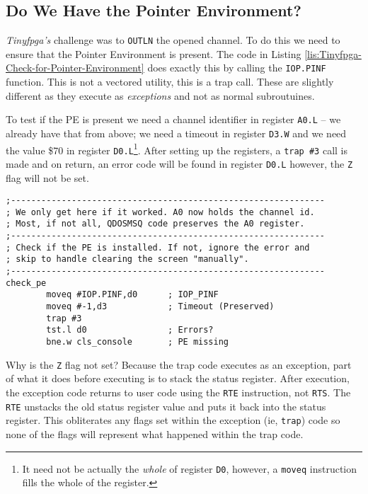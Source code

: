 \subsection{Do We Have the Pointer Environment?}

\emph{Tinyfpga's} challenge was to \texttt{OUTLN} the opened channel.
To do this we need to ensure that the Pointer Environment is present.
The code in Listing \ref{lis:Tinyfpga-Check-for-Pointer-Environment}
does exactly this by calling the \texttt{IOP.PINF} function. This
is not a vectored utility, this is a trap call. These are slightly
different as they execute as \emph{exceptions} and not as normal subroutuines.

To test if the PE is present we need a channel identifier in register
\texttt{A0.L} -- we already have that from above; we need a timeout
in register \texttt{D3.W} and we need the value \$70 in register \texttt{D0.L}\footnote{It need not be actually the \emph{whole} of register \texttt{D0},
however, a \texttt{moveq} instruction fills the whole of the register.}. After setting up the registers, a \texttt{trap \#3} call is made
and on return, an error code will be found in register \texttt{D0.L}
however, the \texttt{Z} flag will not be set.

\begin{lstlisting}[caption={Tinyfpga - Check for Pointer Environment},label={lis:Tinyfpga-Check-for-Pointer-Environment}]
;--------------------------------------------------------------
; We only get here if it worked. A0 now holds the channel id.
; Most, if not all, QDOSMSQ code preserves the A0 register.
;--------------------------------------------------------------
; Check if the PE is installed. If not, ignore the error and
; skip to handle clearing the screen "manually".
;--------------------------------------------------------------
check_pe
        moveq #IOP.PINF,d0      ; IOP_PINF
        moveq #-1,d3            ; Timeout (Preserved)
        trap #3
        tst.l d0                ; Errors?
        bne.w cls_console       ; PE missing

\end{lstlisting}

Why is the \texttt{Z} flag not set? Because the trap code executes
as an exception, part of what it does before executing is to stack
the status register. After execution, the exception code returns to
user code using the \texttt{RTE} instruction, not \texttt{RTS}. The
\texttt{RTE} unstacks the old status register value and puts it back
into the status register. This obliterates any flags set within the
exception (ie, \texttt{trap}) code so none of the flags will represent
what happened within the trap code.

